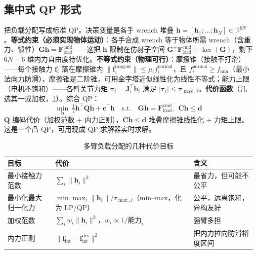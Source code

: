 \subsection{集中式 QP 形式}
\label{sec:ma-qp}

把负载分配写成标准 QP。决策变量是各手 wrench 堆叠 $\mathbf{h}=[\mathbf{h}_1;\dots;\mathbf{h}_N]\in\mathbb{R}^{6N}$。\textbf{等式约束（必须实现物体运动）}：各手合成 wrench 等于物体所需 wrench（含重力、惯性）$\mathbf{G}\mathbf{h}=\mathbf{F}_{\text{load}}^{\text{cmd}}$——这把 $\mathbf{h}$ 限制在仿射子空间 $\mathbf{G}^{+}\mathbf{F}_{\text{load}}^{\text{cmd}}+\ker(\mathbf{G})$，剩下 $6N-6$ 维内力自由度待优化。\textbf{不等式约束（物理可行）}：摩擦锥（接触不打滑）——每个接触力 $\mathbf{f}_i$ 落在摩擦锥内 $\|\mathbf{f}_i^{\text{tangent}}\|\le\mu_i f_i^{\text{normal}}$，且 $f_i^{\text{normal}}\ge f_{\min}$（最小法向力防滑），摩擦锥是二阶锥，可用金字塔近似线性化为线性不等式；能力上限（电机不饱和）——各臂关节力矩 $\boldsymbol{\tau}_i=\mathbf{J}_i^\top\mathbf{h}_i$ 满足 $|\boldsymbol{\tau}_i|\le\boldsymbol{\tau}_{\max,i}$。\textbf{代价函数}（几选其一或加权，\cref{tab:ma-qp-cost}）。综合 QP：
\begin{equation}
  \boxed{\;\min_{\mathbf{h}}\ \tfrac12\mathbf{h}^\top\mathbf{Q}\mathbf{h}+\mathbf{c}^\top\mathbf{h}
  \quad\text{s.t.}\quad \mathbf{G}\mathbf{h}=\mathbf{F}_{\text{load}}^{\text{cmd}},\ \ \mathbf{C}\mathbf{h}\le\mathbf{d}\;}
  \label{eq:ma-qp}
\end{equation}
$\mathbf{Q}$ 编码代价（加权范数 $+$ 内力正则），$\mathbf{C}\mathbf{h}\le\mathbf{d}$ 堆叠摩擦锥线性化 $+$ 力矩上限。这是一个凸 QP，可用现成 QP 求解器实时求解。

\begin{table}[H]\centering\small
\caption{多臂负载分配的几种代价目标}
\label{tab:ma-qp-cost}
\begin{tabular}{lll}
\toprule
目标 & 代价 & 含义 \\
\midrule
最小接触力范数 & $\sum_i\|\mathbf{h}_i\|^2$ & 最省力，但可能不公平 \\
最小化最大归一化力 & $\min\max_i\|\mathbf{h}_i\|/\tau_{\max,i}$（min--max，化为 LP/QP） & 公平，远离饱和，异构友好 \\
加权范数 & $\sum_i w_i\|\mathbf{h}_i\|^2$，$w_i\propto1/\text{能力}_i$ & 强臂多担 \\
内力正则 & $\|\mathbf{f}_{\text{int}}-\mathbf{f}_{\text{int}}^{\text{des}}\|^2$ & 把内力拉向防滑裕度区间 \\
\bottomrule
\end{tabular}
\end{table}

